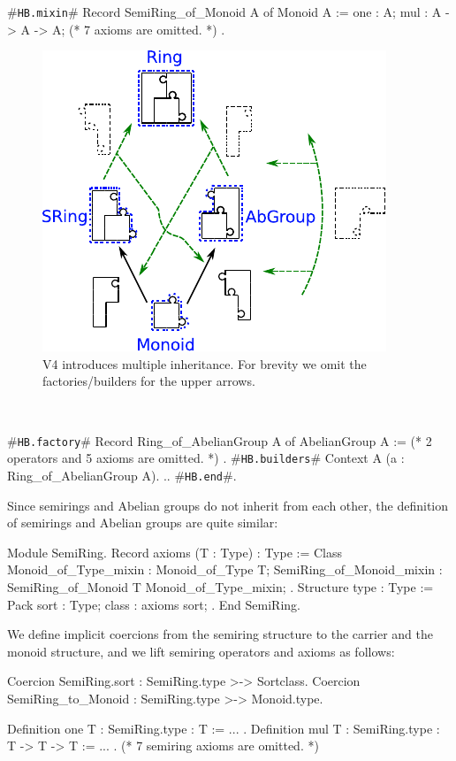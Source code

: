 \documentclass[a4paper,UKenglish,cleveref, autoref]{lipics-v2019}
\newcommand{\hbmixin}{{\tt\color{dkgreen}HB.mixin}}
\newcommand{\hbfactory}{{\tt\color{dkgreen}HB.factory}}
\newcommand{\hbbuilders}{{\tt\color{dkgreen}HB.builders}}
\newcommand{\hbend}{{\tt\color{dkgreen}HB.end}}
\theoremstyle{implem}
\theoremstyle{implem}
\theoremstyle{command}
\begin{document}
\begin{coqcode}
#\hbmixin{}# Record SemiRing_of_Monoid A of Monoid A := {
  one : A;
  mul : A -> A -> A;
  (* 7 axioms are omitted. *)
}.
\end{coqcode}

\begin{figure}
  \includegraphics[width=.4\textwidth]{v4.pdf}
  \caption{V4 introduces multiple inheritance. For brevity we omit the factories/builders for the upper arrows.}
  \label{fig:puzzle_v4}
\end{figure}
\
\begin{coqcode}
#\hbfactory{}# Record Ring_of_AbelianGroup A
  of AbelianGroup A := {
  (* 2 operators and 5 axioms are omitted. *)
}.
#\hbbuilders{}# Context A (a : Ring_of_AbelianGroup A).
..
#\hbend{}#.
\end{coqcode}


Since semirings and Abelian groups do not inherit from each other,
the definition of semirings and Abelian groups are quite similar:
\begin{coqcode}
Module SemiRing.
Record axioms (T : Type) : Type := Class {
  Monoid_of_Type_mixin :
    Monoid_of_Type T;
  SemiRing_of_Monoid_mixin :
    SemiRing_of_Monoid T Monoid_of_Type_mixin;
}.
Structure type : Type := Pack { sort : Type; class : axioms sort; }.
End SemiRing.
\end{coqcode}
We define implicit coercions from the semiring structure to the carrier
and the monoid structure, and we lift semiring operators and axioms as follows:
\begin{coqcode}
Coercion SemiRing.sort : SemiRing.type >-> Sortclass.
Coercion SemiRing_to_Monoid : SemiRing.type >-> Monoid.type.

Definition one {T : SemiRing.type} : T := ... .
Definition mul {T : SemiRing.type} : T -> T -> T := ... .
(* 7 semiring axioms are omitted. *)
\end{coqcode}
\end{document}
